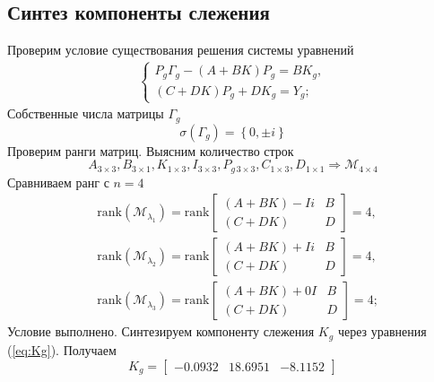 \documentclass[a4paper, 12pt]{article}
\begin{document}
    \subsection{Синтез компоненты слежения}
    Проверим условие существования решения
    системы уравнений
    \begin{align}
    \begin{cases}
    P_g\Gamma_g-\left( A+BK \right)P_g=BK_g,\\
    \left( C+DK \right)P_g+DK_g=Y_g;
    \end{cases} \label{eq:Kg}
    \end{align}
    Собственные числа матрицы $\Gamma_g$
    $$
    \sigma\left( \Gamma_g \right)=\left\{ 0,\pm i \right\}
    $$
    Проверим ранги матриц. Выясним количество строк
    $$A_{3\times3},B_{3\times1},K_{1\times3},I_{3\times3},P_{g\,3\times3},C_{1\times3},D_{1\times1}\Rightarrow \mathcal{M}_{4\times4}$$
    Сравниваем ранг с $n=4$
    \begin{align*}
    &\text{rank}\left( \mathcal{M}_{\lambda_1} \right)=\text{rank}\begin{bmatrix}
        \left( A+BK \right)-Ii &B\\
        \left( C+DK \right) &D
    \end{bmatrix}=4,\\
    &\text{rank}\left( \mathcal{M}_{\lambda_2} \right)=\text{rank}\begin{bmatrix}
        \left( A+BK \right)+Ii &B\\
        \left( C+DK \right) &D
    \end{bmatrix}=4,\\
    &\text{rank}\left( \mathcal{M}_{\lambda_3} \right)=\text{rank}\begin{bmatrix}
        \left( A+BK \right)+0I &B\\
        \left( C+DK \right) &D
    \end{bmatrix}=4;
    \end{align*}
    Условие выполнено. Синтезируем компоненту слежения $K_g$ через уравнения (\ref{eq:Kg}).
    Получаем
    $$
    K_g=
    \begin{bmatrix}
        -0.0932   &18.6951   &-8.1152
    \end{bmatrix}
    $$
\end{document}

